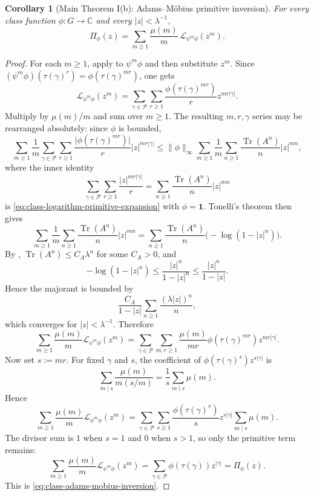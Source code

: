 \documentclass[11pt,a4paper]{amsart}
\theoremstyle{plain}
\newtheorem{corollary}[theorem]{Corollary}
\theoremstyle{definition}
\theoremstyle{remark}
\DeclareMathOperator{\Tr}{Tr}
\newcommand{\CC}{\mathbb{C}}
\newcommand{\cP}{\mathcal P}
\newcommand{\abs}[1]{\lvert #1 \rvert}
\newcommand{\norm}[1]{\lVert #1 \rVert}
\begin{document}
\begin{corollary}[Main Theorem I(b): Adams--M\"obius primitive
  inversion]
  \label{cor:class-function-adams-mobius}
  For every class function \(\phi:G\to\CC\) and every \(|z|<\lambda^{-1}\),
  \begin{equation}\label{eq:class-adams-mobius-inversion}
    \Pi_\phi(z)
    =
    \sum_{m\ge 1}\frac{\mu(m)}{m}\,
      \mathcal L_{\psi^m\phi}(z^m).
  \end{equation}
\end{corollary}

\begin{proof}
  For each \(m\ge 1\), apply
   to \(\psi^m\phi\) and
  then substitute \(z^m\). Since
  \((\psi^m\phi)(\tau(\gamma)^r)=\phi(\tau(\gamma)^{mr})\), one gets
  \[
    \mathcal L_{\psi^m\phi}(z^m)
    =
    \sum_{\gamma\in\cP}\sum_{r\ge 1}
      \frac{\phi(\tau(\gamma)^{mr})}{r}z^{mr|\gamma|}.
  \]
  Multiply by \(\mu(m)/m\) and sum over \(m\ge 1\). The resulting
  \(m,r,\gamma\) series may be rearranged absolutely: since \(\phi\) is
  bounded,
  \[
    \sum_{m\ge 1}\frac{1}{m}
      \sum_{\gamma\in\cP}\sum_{r\ge 1}
        \frac{\abs{\phi(\tau(\gamma)^{mr})}}{r}|z|^{mr|\gamma|}
    \le
    \norm{\phi}_\infty
    \sum_{m\ge 1}\frac{1}{m}
      \sum_{n\ge 1}\frac{\Tr(A^n)}{n}|z|^{mn},
  \]
  where the inner identity
  \[
    \sum_{\gamma\in\cP}\sum_{r\ge 1}\frac{|z|^{mr|\gamma|}}{r}
    =
    \sum_{n\ge 1}\frac{\Tr(A^n)}{n}|z|^{mn}
  \]
  is \eqref{eq:class-logarithm-primitive-expansion} with
  \(\phi=\mathbf 1\). Tonelli's theorem then gives
  \[
    \sum_{m\ge 1}\frac{1}{m}
      \sum_{n\ge 1}\frac{\Tr(A^n)}{n}|z|^{mn}
    =
    \sum_{n\ge 1}\frac{\Tr(A^n)}{n}
      \bigl(-\log(1-|z|^n)\bigr).
  \]
  By ,
  \(\Tr(A^n)\le C_A\lambda^n\) for some \(C_A>0\), and
  \[
    -\log(1-|z|^n)\le \frac{|z|^n}{1-|z|^n}\le \frac{|z|^n}{1-|z|}.
  \]
  Hence the majorant is bounded by
  \[
    \frac{C_A}{1-|z|}
    \sum_{n\ge 1}\frac{(\lambda|z|)^n}{n},
  \]
  which converges for \(|z|<\lambda^{-1}\). Therefore
  \[
    \sum_{m\ge 1}\frac{\mu(m)}{m}\mathcal L_{\psi^m\phi}(z^m)
    =
    \sum_{\gamma\in\cP}\sum_{m,r\ge 1}
      \frac{\mu(m)}{mr}\phi(\tau(\gamma)^{mr})z^{mr|\gamma|}.
  \]
  Now set \(s:=mr\). For fixed \(\gamma\) and \(s\), the coefficient of
  \(\phi(\tau(\gamma)^s)z^{s|\gamma|}\) is
  \[
    \sum_{m\mid s}\frac{\mu(m)}{m(s/m)}
    =
    \frac{1}{s}\sum_{m\mid s}\mu(m).
  \]
  Hence
  \[
    \sum_{m\ge 1}\frac{\mu(m)}{m}\mathcal L_{\psi^m\phi}(z^m)
    =
    \sum_{\gamma\in\cP}\sum_{s\ge 1}
      \frac{\phi(\tau(\gamma)^s)}{s}z^{s|\gamma|}
      \sum_{m\mid s}\mu(m).
  \]
  The divisor sum is \(1\) when \(s=1\) and \(0\) when \(s>1\), so only
  the primitive term remains:
  \[
    \sum_{m\ge 1}\frac{\mu(m)}{m}\mathcal L_{\psi^m\phi}(z^m)
    =
    \sum_{\gamma\in\cP}\phi(\tau(\gamma))z^{|\gamma|}
    =
    \Pi_\phi(z).
  \]
  This is \eqref{eq:class-adams-mobius-inversion}.
\end{proof}
\end{document}

